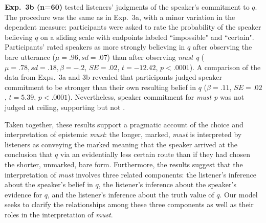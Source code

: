 \documentclass[11pt]{article}
\begin{document}
\textbf{Exp.~3b (n=60)} tested listeners' judgments of the speaker's commitment to $q$. The procedure was the same as in Exp.~3a, with a minor variation in the dependent measure: participants were asked to rate the probability of the speaker believing $q$ on a sliding scale with endpoints labeled ``impossible" and ``certain". Participants' rated speakers as more strongly believing in $q$ after observing the bare utterance ($\mu=.96,sd=.07$) than after observing  \emph{must q}  ($\mu=.78,sd=.18, \beta=-.2$, $SE=.02$, $t=-12.42$, $p<.0001$). A comparison of the data from Exps.~3a and 3b revealed that participants judged speaker commitment to be stronger than their own resulting belief in $q$ ($\beta=.11$, $SE=.02$, $t=5.39$, $p<.0001$). Nevertheless, speaker commitment for \emph{must p} was not judged at ceiling, supporting  but not .



Taken together, these results support a pragmatic account of the choice and interpretation of epistemic \emph{must}: the longer, marked, \emph{must} is interpreted by listeners as conveying the marked meaning that the speaker arrived at the conclusion that $q$ via an evidentially less certain route than if they had chosen the shorter, unmarked, bare form. Furthermore, the results suggest that the interpretation of \emph{must} involves three related components: the listener's inference about the speaker's belief in $q$, the listener's inference about the speaker's evidence for $q$, and the listener's inference about the truth value of $q$. Our model seeks to clarify the relationships among these three components as well as their roles in the interpretation of \emph{must}. %
\end{document}
